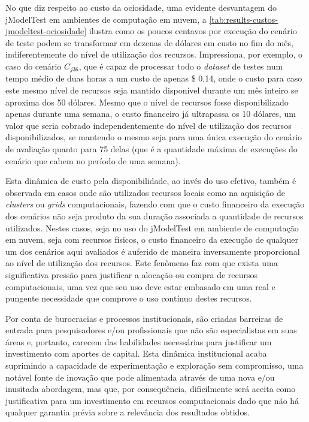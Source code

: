 \documentclass[english,brazilian]{UNISINOSmonografia} %
\begin{document}

No que diz respeito ao custo da ociosidade, uma evidente desvantagem do jModelTest em ambientes de computação em nuvem, a \autoref{tab:results-custos-jmodeltest-ociosidade} ilustra como os poucos centavos por execução do cenário de teste podem se transformar em dezenas de dólares em custo no fim do mês, indiferentemente do nível de utilização dos recursos.
%
Impressiona, por exemplo, o caso do cenário $C_{j36}$, que é capaz de processar todo o \textit{dataset} de testes num tempo médio de duas horas a um custo de apenas \$ 0,14, onde o custo para caso este mesmo nível de recursos seja mantido disponível durante um mês inteiro se aproxima dos 50 dólares.
%
Mesmo que o nível de recursos fosse disponibilizado apenas durante uma semana, o custo financeiro já ultrapassa os 10 dólares, um valor que seria cobrado independentemente do nível de utilização dos recursos disponibilizados, se mantendo o mesmo seja para uma única execução do cenário de avaliação quanto para 75 delas (que é a quantidade máxima de execuções do cenário que cabem no período de uma semana).



Esta dinâmica de custo pela disponibilidade, ao invés do uso efetivo, também é observada em casos onde são utilizados recursos locais como na aquisição de \textit{clusters} ou \textit{grids} computacionais, fazendo com que o custo financeiro da execução dos cenários não seja produto da sua duração associada a quantidade de recursos utilizados.
%
Nestes casos, seja no uso do jModelTest em ambiente de computação em nuvem, seja com recursos físicos, o custo financeiro da execução de qualquer um dos cenários aqui avaliados é auferido de maneira inversamente proporcional ao nível de utilização dos recursos.
%
Este fenômeno faz com que exista uma significativa pressão para justificar a alocação ou compra de recursos computacionais, uma vez que seu uso deve estar embasado em uma real e pungente necessidade que comprove o uso contínuo destes recursos.



Por conta de burocracias e processos institucionais, são criadas barreiras de entrada para pesquisadores e/ou profissionais que não são especialistas em suas áreas e, portanto, carecem das habilidades necessárias para justificar um investimento com aportes de capital.
%
Esta dinâmica institucional acaba suprimindo a capacidade de experimentação e exploração sem compromisso, uma notável fonte de inovação que pode alimentada através de uma nova e/ou inusitada abordagem, mas que, por consequência, dificilmente será aceita como justificativa para um investimento em recursos computacionais dado que não há qualquer garantia prévia sobre a relevância dos resultados obtidos.
\end{document}
